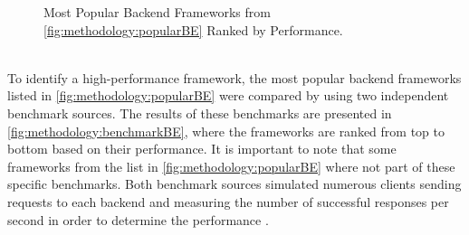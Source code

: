 \begin{figure}[htbp] \ContinuedFloat
  \myfloatalign
   \caption{Most Popular Backend Frameworks from \autoref{fig:methodology:popularBE} Ranked by Performance.}
   \label{fig:methodology:benchmarkBE}
\end{figure}
~\\
To identify a high-performance framework, the most popular backend frameworks listed in \autoref{fig:methodology:popularBE} were compared by using two independent benchmark sources. The results of these benchmarks are presented in \autoref{fig:methodology:benchmarkBE}, where the frameworks are ranked from top to bottom based on their performance. It is important to note that some frameworks from the list in \autoref{fig:methodology:popularBE} where not part of these specific benchmarks. Both benchmark sources simulated numerous clients sending requests to each backend and measuring the number of successful responses per second in order to determine the performance \cite{backend:benchmark1, backend:benchmark2}.

